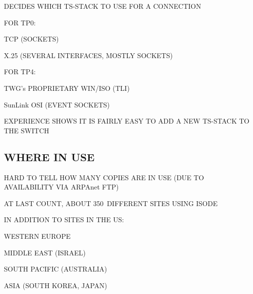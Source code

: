 \begin{bwslide}

\begin{nrtc}
\item	DECIDES WHICH TS-STACK TO USE FOR A CONNECTION

\item	FOR TP0:
    \begin{nrtc}
    \item	TCP (SOCKETS)

    \item	X.25 (SEVERAL INTERFACES, MOSTLY SOCKETS)
    \end{nrtc}

\item	FOR TP4:
    \begin{nrtc}
    \item	TWG's PROPRIETARY WIN/ISO (TLI)

    \item	SunLink OSI (EVENT SOCKETS)
    \end{nrtc}

\item	EXPERIENCE SHOWS IT IS FAIRLY EASY TO ADD A NEW TS-STACK TO THE SWITCH
\end{nrtc}
\end{bwslide}


\begin{bwslide}
\part*	{WHERE IN USE}\bf

\begin{nrtc}
\item	HARD TO TELL HOW MANY COPIES ARE IN USE (DUE TO AVAILABILITY VIA
	ARPAnet FTP)

\item	AT LAST COUNT, ABOUT 350~DIFFERENT SITES USING ISODE

\item	IN ADDITION TO SITES IN THE US:
    \begin{nrtc}
    \item	WESTERN EUROPE

    \item	MIDDLE EAST (ISRAEL)

    \item	SOUTH PACIFIC (AUSTRALIA)

    \item	ASIA (SOUTH KOREA, JAPAN)
    \end{nrtc}
\end{nrtc}
\end{bwslide}



